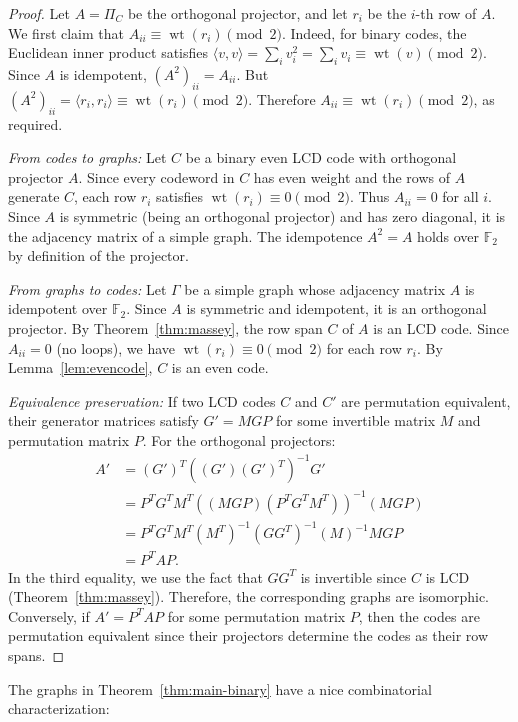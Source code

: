 \documentclass[a4paper,11pt]{article}
\theoremstyle{remark}
\newcommand{\FF}{\mathbb{F}}
\DeclareMathOperator{\wt}{wt}
\begin{document}
\begin{proof}
Let $A = \Pi_C$ be the orthogonal projector, and let $r_i$ be the $i$-th row of $A$.
We first claim that $A_{ii} \equiv \wt(r_i) \pmod 2$.
Indeed, for binary codes, the Euclidean inner product satisfies $\langle v, v \rangle = \sum_i v_i^2 = \sum_i v_i \equiv \wt(v) \pmod 2$.
Since $A$ is idempotent, $(A^2)_{ii}=A_{ii}$. But $(A^2)_{ii} = \langle r_i, r_i \rangle \equiv \wt(r_i) \pmod 2$. Therefore $A_{ii} \equiv \wt(r_i) \pmod 2$, as required.

\emph{From codes to graphs:} Let $C$ be a binary even LCD code with orthogonal projector $A$. Since every codeword in $C$ has even weight and the rows of $A$ generate $C$, each row $r_i$ satisfies $\wt(r_i) \equiv 0 \pmod 2$. Thus $A_{ii} = 0$ for all $i$. Since $A$ is symmetric (being an orthogonal projector) and has zero diagonal, it is the adjacency matrix of a simple graph. The idempotence $A^2 = A$ holds over $\FF_2$ by definition of the projector.

\emph{From graphs to codes:} Let $\Gamma$ be a simple graph whose adjacency matrix $A$ is idempotent over $\FF_2$. Since $A$ is symmetric and idempotent, it is an orthogonal projector. By Theorem~\ref{thm:massey}, the row span $C$ of $A$ is an LCD code. Since $A_{ii} = 0$ (no loops), we have $\wt(r_i) \equiv 0 \pmod 2$ for each row $r_i$.
By Lemma~\ref{lem:evencode}, $C$ is an even code.

\emph{Equivalence preservation:} If two LCD codes $C$ and $C'$ are permutation equivalent, their generator matrices satisfy $G' = MG P$ for some invertible matrix $M$ and permutation matrix $P$. For the orthogonal projectors:
\begin{align*}
A'
&= (G')^T((G')(G')^T)^{-1}G'\\
&= P^T G^T M^T((MGP)(P^T G^T M^T))^{-1}(MGP)\\
&= P^T G^T M^T (M^T)^{-1} (GG^T)^{-1} (M)^{-1} MGP\\
&= P^TAP.
\end{align*}
In the third equality, we use the fact that $GG^T$ is invertible since $C$ is LCD (Theorem~\ref{thm:massey}).
Therefore, the corresponding graphs are isomorphic.
Conversely, if $A' = P^TAP$ for some permutation matrix $P$, then the codes are permutation equivalent since their projectors determine the codes as their row spans.
\end{proof}

The graphs in Theorem~\ref{thm:main-binary} have a nice combinatorial characterization:
\end{document}

